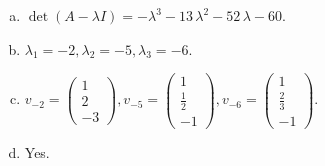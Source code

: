 \begin{questions}
\begin{solution}
\begin{enumerate}[(a)]
\item $\det(A-\lambda I)=-{\lambda}^{3} - 13 \, {\lambda}^{2} - 52 \, {\lambda} - 60$.
\item ${\lambda}_1=-2, {\lambda}_2=-5, {\lambda}_3=-6$.
\item $v_{-2}=\left(\begin{array}{r}
1 \\
2 \\
-3
\end{array}\right), v_{-5}=\left(\begin{array}{r}
1 \\
\frac{1}{2} \\
-1
\end{array}\right), v_{-6}=\left(\begin{array}{r}
1 \\
\frac{2}{3} \\
-1
\end{array}\right)$.
\item Yes.
\end{enumerate}
\end{solution}

\end{questions}

\newpage


\begin{center}
\end{center}

